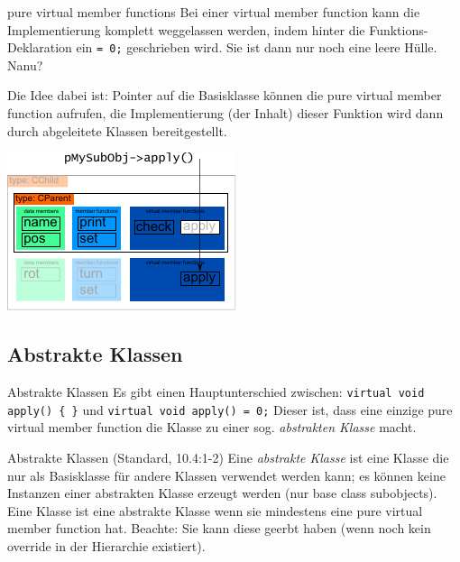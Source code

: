 \begin{frame}[fragile,b]{pure virtual member functions}
	Bei einer virtual member function kann die Implementierung komplett weggelassen werden, indem hinter die Funktions-Deklaration ein \verb|= 0;| geschrieben wird. Sie ist dann nur noch eine leere Hülle. Nanu?
	
	\pause
	
	Die Idee dabei ist: Pointer auf die Basisklasse können die pure virtual member function aufrufen, die Implementierung (der Inhalt) dieser Funktion wird dann durch abgeleitete Klassen bereitgestellt.
	
	\vspace{1em}
	\includegraphics[width=0.5\linewidth]{images/pMySubObj-pureVirtApply}
\end{frame}


\subsection{Abstrakte Klassen}

\begin{frame}[fragile]{Abstrakte Klassen}
	Es gibt einen Hauptunterschied zwischen:
	\verb|virtual void apply() { }|
	und
	\verb|virtual void apply() = 0;|
	Dieser ist, dass eine einzige pure virtual member function die Klasse zu einer sog. \emph{abstrakten Klasse} macht.
	
	\pause
	
	\begin{block}{Abstrakte Klassen (Standard, 10.4:1-2)}
		Eine \emph{abstrakte Klasse} ist eine Klasse die nur als Basisklasse für andere Klassen verwendet werden kann; es können keine Instanzen einer abstrakten Klasse erzeugt werden (nur base class subobjects). Eine Klasse ist eine abstrakte Klasse wenn sie mindestens eine pure virtual member function hat. Beachte: Sie kann diese geerbt haben (wenn noch kein override in der Hierarchie existiert).
	\end{block}
\end{frame}

